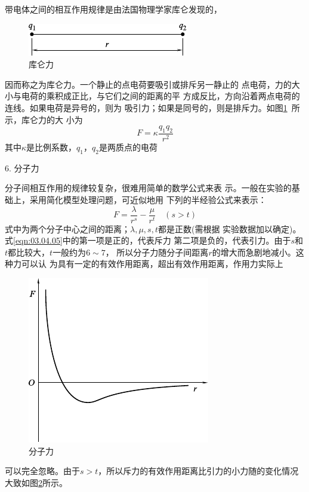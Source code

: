 带电体之间的相互作用规律是由法国物理学家库仑发现的，
\begin{figure}
  \includegraphics{figure/fig03.06}
  \caption{库仑力}
  \label{fig:03.06}
\end{figure}
因而称之为库仑力。一个静止的点电荷要吸引或排斥另一静止的
点电荷，力的大小与电荷的乘积成正比，与它们之间的距离的平
方成反比，方向沿着两点电荷的连线。如果电荷是异号的，则为
吸引力；如果是同号的，则是排斥力。如图\ref{fig:03.06}~所示，库仑力的大
小为
\begin{equation}\label{eqn:03.04.04}
  F = \kappa \frac { q _ { 1 } q _ { 2 } } { r ^ { 2 } }
\end{equation}
其中$ \kappa $是比例系数，$ q _ { 1 } $，$ q _ { 2 } $是两质点的电荷

\textsf{6. 分子力}

分子间相互作用的规律较复杂，很难用简单的数学公式来表
示。一般在实验的基础上，采用简化模型处理问题，可近似地用
下列的半经验公式来表示：
\begin{equation}\label{eqn:03.04.05}
  F = \frac { \lambda } { r ^ { s } } - \frac { \mu } { r ^ t } \quad \left( s > t \right)
\end{equation}
式中为两个分子中心之间的距离；$\lambda,\mu, s , t $都是正数(需根据
实验数据加以确定)。式\eqref{eqn:03.04.05}中的第一项是正的，代表斥力
第二项是负的，代表引力。由于$ s $和$ t $都比较大，$ t $一般约为$ 6\sim 7 $，
所以分子力随分子间距离$ r $的增大而急剧地减小。这种力可以认
为具有一定的有效作用距离，超出有效作用距离，作用力实际上
\begin{figure}
  \includegraphics{figure/fig03.07}
  \caption{分子力}
  \label{fig:03.07}
\end{figure}
可以完全忽略。由于$ s > t $，所以斥力的有效作用距离比引力的小力随的变化情况大致如图\ref{fig:03.07}所示。

